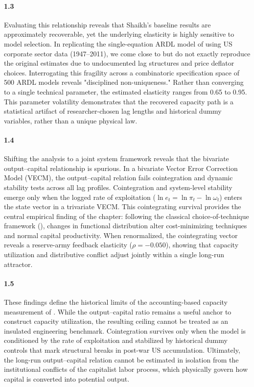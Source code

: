 \paragraph{1.3}
Evaluating this relationship reveals that Shaikh's baseline results are approximately recoverable, yet the underlying elasticity is highly sensitive to model selection. In replicating the single-equation ARDL model of \citet{Shaikh2016} using US corporate sector data (1947–2011), we come close to but do not exactly reproduce the original estimates due to undocumented lag structures and price deflator choices. Interrogating this fragility across a combinatoric specification space of 500 ARDL models reveals "disciplined non-uniqueness." Rather than converging to a single technical parameter, the estimated elasticity ranges from 0.65 to 0.95. This parameter volatility demonstrates that the recovered capacity path is a statistical artifact of researcher-chosen lag lengths and historical dummy variables, rather than a unique physical law.

\paragraph{1.4}
Shifting the analysis to a joint system framework reveals that the bivariate output--capital relationship is spurious. In a bivariate Vector Error Correction Model (VECM), the output--capital relation fails cointegration and dynamic stability tests across all lag profiles. Cointegration and system-level stability emerge only when the logged rate of exploitation ($\ln e_t = \ln \pi_t - \ln \omega_t$) enters the state vector in a trivariate VECM. This cointegrating survival provides the central empirical finding of the chapter: following the classical choice-of-technique framework (\citealp{Kurz1986}), changes in functional distribution alter cost-minimizing techniques and normal capital productivity. When renormalized, the cointegrating vector reveals a reserve-army feedback elasticity ($\rho = -0.050$), showing that capacity utilization and distributive conflict adjust jointly within a single long-run attractor.

\paragraph{1.5}
These findings define the historical limits of the accounting-based capacity measurement of \citet{Shaikh2016}. While the output–capital ratio remains a useful anchor to construct capacity utilization, the resulting ceiling cannot be treated as an insulated engineering benchmark. Cointegration survives only when the model is conditioned by the rate of exploitation and stabilized by historical dummy controls that mark structural breaks in post-war US accumulation. Ultimately, the long-run output–capital relation cannot be estimated in isolation from the institutional conflicts of the capitalist labor process, which physically govern how capital is converted into potential output.


